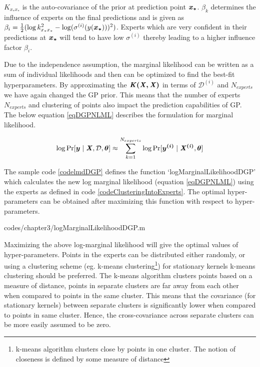 $K_{x_{*}x_{*}}$ is the auto-covariance of the prior at prediction point $\boldsymbol{x_{*}}$. $\beta_{k}$ determines the influence of experts on the final predictions \cite{caoF14} and is given as $\beta_{i} = \frac{1}{2}(\log k_{x_{*}x_{*}}^{2} - \log(\sigma^{(i)}(y(\boldsymbol{x_{*}})))^{2})$. Experts which are very confident in their predictions at $\boldsymbol{x_{*}}$ will tend to have low $\sigma^{(i)}$ thereby leading to a higher influence factor $\beta_{i}$.

Due to the independence assumption, the marginal likelihood can be written as a sum of individual likelihoods and then can be optimized to find the best-fit hyperparameters. By approximating the $\bm{\mathit{K(X, X)}}$ in terms of $\mathcal{D}^{(i)}$ and $N_{experts}$ we have again changed the GP prior. This means that the number of experts $N_{experts}$ and clustering of points also impact the prediction capabilities of GP. The below equation \ref{eqDGPNLML} describes the formulation for marginal likelihood. 

\begin{align}\label{eqDGPNLML}
    \log \Pr[\boldsymbol{y} \mid \bm{\mathit{X}}, \mathcal{D}, \boldsymbol{\theta}] \approx \sum_{k=1}^{N_{experts}} \log \Pr[\boldsymbol{y^{(i)}}\mid \bm{\mathit{X^{(i)}}}, \boldsymbol{\theta}]
 \end{align}

The sample code \ref{codelmdDGP} defines the function `logMarginalLikelihoodDGP' which calculates the new log marginal likelihood (equation \ref{eqDGPNLML}) using the experts as defined in code \ref{codeClusteringIntoExperts}. The optimal hyper-parameters can be obtained after maximizing this function with respect to hyper-parameters. 

\begin{mdframed}[hidealllines=true,backgroundcolor=lightgray!20]

                    {codes/chapter3/logMarginalLikelihoodDGP.m}
\end{mdframed}

Maximizing the above log-marginal likelihood will give the optimal values of hyper-parameters. Points in the experts can be distributed either randomly, or using a clustering scheme (eg. k-means clustering\footnote{k-means algorithm clusters close by points in one cluster. The notion of closeness is defined by some measure of distance}) for stationary kernels k-means clustering should be preferred. The k-means algorithm clusters points based on a measure of distance, points in separate clusters are far away from each other when compared to points in the same cluster. This means that the covariance (for stationary kernels) between separate clusters is significantly lower when compared to points in same cluster. Hence, the cross-covariance across separate clusters can be more easily assumed to be zero.

